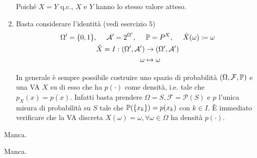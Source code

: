 \begin{enumerate}
Poiché $X=Y$ q.c., $X$ e $Y$ hanno lo stesso valore atteso.
\item Basta considerare l'identità (vedi esercizio $5$)\begin{gather*}
\Omega '=\{0,1\} ,\ \ \ \ \mathcal{A} '=2^{\Omega '} ,\ \ \ \ \mathbb{P} =P^{X} ,\ \ \ \ \tilde{X}( \omega ) \coloneqq \omega \\
\begin{aligned}
\tilde{X} =I:( \Omega ',\mathcal{A} ') & \rightarrow ( \Omega ',\mathcal{A} ')\\
\omega  & \mapsto \omega 
\end{aligned}
\end{gather*}

\begin{oss}
In generale è sempre possibile costruire uno spazio di probabilità $( \Omega ,\mathcal{F} ,\mathbb{P})$ e una VA $X$ su di esso che ha $p( \cdotp )$ come densità, i.e. tale che $p_{X}( x) =p( x)$. Infatti basta prendere $\Omega =S,\mathcal{F} =\mathcal{P}( S)$ e $p$ l'unica misura di probabilità su $S$ tale che $\mathbb{P}(\{x_{k}\}) =p( x_{k})$ con $k\in I$. È immediato verificare che la VA discreta $X( \omega ) =\omega ,\forall \omega \in \Omega $ ha densità $p( \cdotp )$.
\end{oss}
\end{enumerate}
\Soluzione

Manca.
\Soluzione

Manca.
\Soluzione

